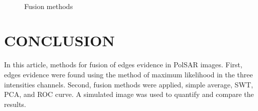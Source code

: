 \documentclass[a4paper,12pt]{article}
\begin{document}
\begin{figure}[hbt]
	\centering
     \\
     \caption{Fusion methods}
     \label{fusion_met}
\end{figure}



	\section{CONCLUSION}
In this article, methods for fusion of edges evidence in PolSAR images. 
First, edges evidence were found using the method of maximum likelihood in the three intensities channels. 
Second, fusion methods were applied, simple average, SWT, PCA, and ROC curve. A simulated image was used to quantify and compare the results. 
\end{document}
